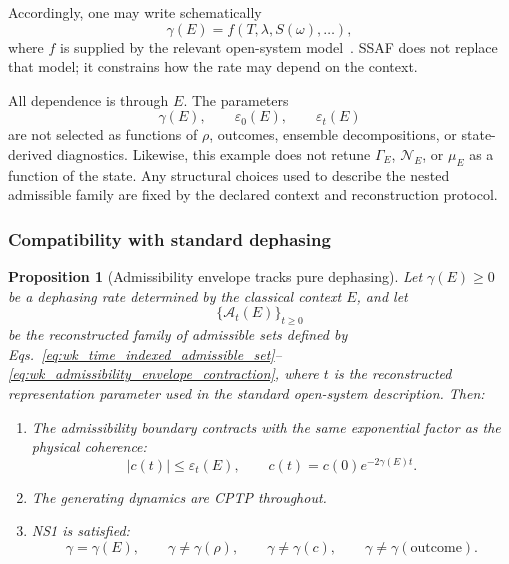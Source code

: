 \documentclass[aps,prx,onecolumn,11pt]{revtex4-2}
\theoremstyle{plain}
\newtheorem{proposition}{Proposition}
\theoremstyle{definition}
\theoremstyle{remark}
\begin{document}
Accordingly, one may write schematically
\begin{equation}
\gamma(E)
=
f\!\left(T,\lambda,S(\omega),\ldots\right),
\label{eq:wk_gamma_context_function}
\end{equation}
where \(f\) is supplied by the relevant open-system
model~\cite{BreuerPetruccione2002}. SSAF does not replace that model;
it constrains how the rate may depend on the context.

All dependence is through \(E\). The parameters
\[
\gamma(E),
\qquad
\varepsilon_0(E),
\qquad
\varepsilon_t(E)
\]
are not selected as functions of \(\rho\), outcomes, ensemble
decompositions, or state-derived diagnostics. Likewise, this example
does not retune \(\Gamma_E\), \(\mathcal N_E\), or \(\mu_E\) as a
function of the state. Any structural choices used to describe the
nested admissible family are fixed by the declared context and
reconstruction protocol.

\subsubsection{Compatibility with standard dephasing}

\begin{proposition}[Admissibility envelope tracks pure dephasing]
\label{prop:admissibility_reproduces_dephasing}
Let \(\gamma(E)\geq 0\) be a dephasing rate determined by the classical
context \(E\), and let
\[
\{\mathcal A_t(E)\}_{t\geq 0}
\]
be the reconstructed family of admissible sets defined by
Eqs.~\eqref{eq:wk_time_indexed_admissible_set}--\eqref{eq:wk_admissibility_envelope_contraction},
where \(t\) is the reconstructed representation parameter used in the
standard open-system description. Then:
\begin{enumerate}[label=(\roman*), leftmargin=2.2em]
\item The admissibility boundary contracts with the same exponential
factor as the physical coherence:
\begin{equation}
|c(t)|\leq \varepsilon_t(E),
\qquad
c(t)=c(0)e^{-2\gamma(E)t}.
\label{eq:wk_decoherence_as_admissibility_contraction}
\end{equation}

\item The generating dynamics are CPTP throughout.

\item NS1 is satisfied:
\begin{equation}
\gamma=\gamma(E),
\qquad
\gamma\neq\gamma(\rho),
\qquad
\gamma\neq\gamma(c),
\qquad
\gamma\neq\gamma(\mathrm{outcome}).
\label{eq:wk_ns1_decoherence_condition}
\end{equation}
\end{enumerate}
\end{proposition}
\end{document}
